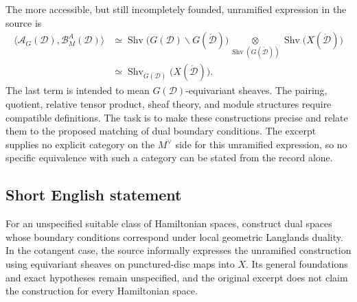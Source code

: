\documentclass[11pt]{article}
\begin{document}
The more accessible, but still incompletely founded, unramified expression in the source is
\[
\begin{aligned}
\bigl\langle\mathcal A_G(\mathcal D),\mathcal B^A_M(\mathcal D)\bigr\rangle
&\simeq
\operatorname{Shv}\bigl(G(\mathcal D)\backslash G(\mathring{\mathcal D})\bigr)
\underset{\operatorname{Shv}(G(\mathring{\mathcal D}))}{\otimes}
\operatorname{Shv}\bigl(X(\mathring{\mathcal D})\bigr)\\
&\simeq
\operatorname{Shv}_{G(\mathcal D)}\bigl(X(\mathring{\mathcal D})\bigr).
\end{aligned}
\]
The last term is intended to mean \(G(\mathcal D)\)-equivariant sheaves. The pairing, quotient, relative tensor product, sheaf theory, and module structures require compatible definitions. The task is to make these constructions precise and relate them to the proposed matching of dual boundary conditions. The excerpt supplies no explicit category on the \(M^\vee\) side for this unramified expression, so no specific equivalence with such a category can be stated from the record alone.
\subsection{Short English statement}
For an unspecified suitable class of Hamiltonian spaces, construct dual spaces whose boundary conditions correspond under local geometric Langlands duality. In the cotangent case, the source informally expresses the unramified construction using equivariant sheaves on punctured-disc maps into \(X\). Its general foundations and exact hypotheses remain unspecified, and the original excerpt does not claim the construction for every Hamiltonian space.
\end{document}
